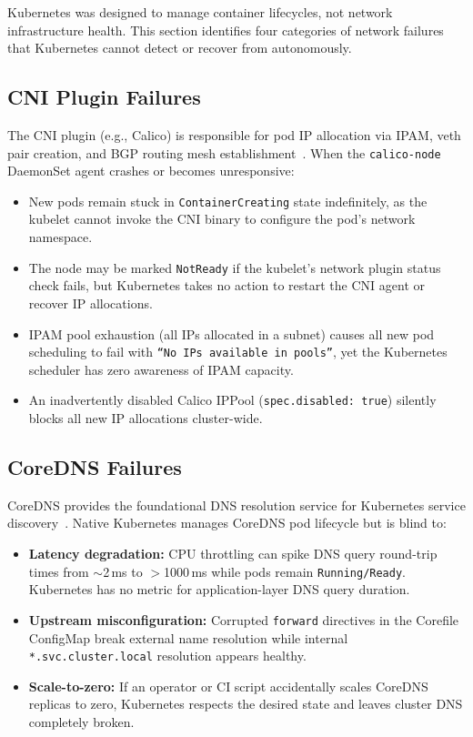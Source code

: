 \documentclass[conference]{IEEEtran}
\begin{document}
Kubernetes was designed to manage container lifecycles, not network infrastructure health. This section identifies four categories of network failures that Kubernetes cannot detect or recover from autonomously.

\subsection{CNI Plugin Failures}
The CNI plugin (e.g., Calico) is responsible for pod IP allocation via IPAM, veth pair creation, and BGP routing mesh establishment~\cite{calico-docs, cni-spec}. When the \texttt{calico-node} DaemonSet agent crashes or becomes unresponsive:
\begin{itemize}
  \item New pods remain stuck in \texttt{ContainerCreating} state indefinitely, as the kubelet cannot invoke the CNI binary to configure the pod's network namespace.
  \item The node may be marked \texttt{NotReady} if the kubelet's network plugin status check fails, but Kubernetes takes no action to restart the CNI agent or recover IP allocations.
  \item IPAM pool exhaustion (all IPs allocated in a subnet) causes all new pod scheduling to fail with \texttt{``No IPs available in pools''}, yet the Kubernetes scheduler has zero awareness of IPAM capacity.
  \item An inadvertently disabled Calico IPPool (\texttt{spec.disabled:~true}) silently blocks all new IP allocations cluster-wide.
\end{itemize}

\subsection{CoreDNS Failures}
CoreDNS provides the foundational DNS resolution service for Kubernetes service discovery~\cite{coredns-docs}. Native Kubernetes manages CoreDNS pod lifecycle but is blind to:
\begin{itemize}
  \item \textbf{Latency degradation:} CPU throttling can spike DNS query round-trip times from $\sim$2\,ms to $>$1000\,ms while pods remain \texttt{Running/Ready}. Kubernetes has no metric for application-layer DNS query duration.
  \item \textbf{Upstream misconfiguration:} Corrupted \texttt{forward} directives in the Corefile ConfigMap break external name resolution while internal \texttt{*.svc.cluster.local} resolution appears healthy.
  \item \textbf{Scale-to-zero:} If an operator or CI script accidentally scales CoreDNS replicas to zero, Kubernetes respects the desired state and leaves cluster DNS completely broken.
\end{itemize}
\end{document}

